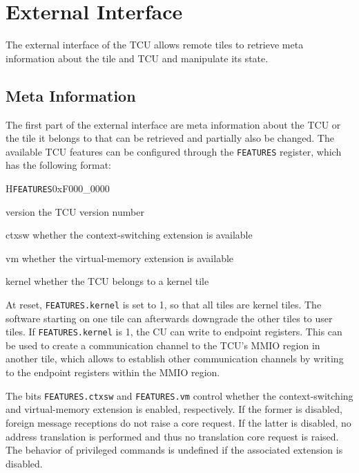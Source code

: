 \chapter{External Interface}

The external interface of the TCU allows remote tiles to retrieve meta information about the tile
and TCU and manipulate its state.

\section{Meta Information}

The first part of the external interface are meta information about the TCU or the tile it belongs
to that can be retrieved and partially also be changed. The available TCU features can be configured
through the \texttt{FEATURES} register, which has the following format:

\setlength{\regWidth}{.95\textwidth}
\begin{register}{H}{\texttt{FEATURES}}{0xF000\_0000}
  \regnewline%
  \begin{regdesc}\begin{reglist}
    \item[version] the TCU version number
    \item[ctxsw] whether the context-switching extension is available
    \item[vm] whether the virtual-memory extension is available
    \item[kernel] whether the TCU belongs to a kernel tile
  \end{reglist}\end{regdesc}
\end{register}
\setlength{\regWidth}{\textwidth}

\noindent At reset, \texttt{FEATURES.kernel} is set to 1, so that all tiles are kernel tiles. The
software starting on one tile can afterwards downgrade the other tiles to user tiles. If
\texttt{FEATURES.kernel} is 1, the CU can write to endpoint registers. This can be used to create a
communication channel to the TCU's MMIO region in another tile, which allows to establish other
communication channels by writing to the endpoint registers within the MMIO region.

The bits \texttt{FEATURES.ctxsw} and \texttt{FEATURES.vm} control whether the context-switching and
virtual-memory extension is enabled, respectively. If the former is disabled, foreign message
receptions do not raise a core request. If the latter is disabled, no address translation is
performed and thus no translation core request is raised. The behavior of privileged commands is
undefined if the associated extension is disabled.

